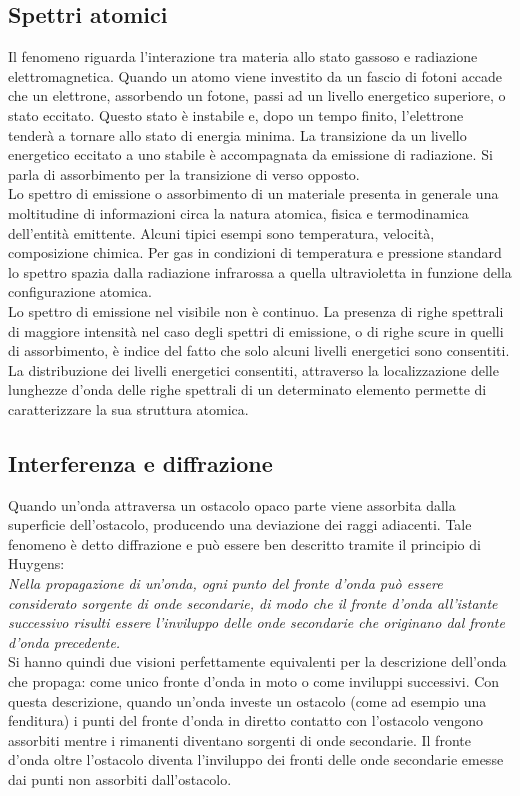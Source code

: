 \subsection{Spettri atomici }
Il  fenomeno  riguarda  l’interazione  tra  materia  allo  stato  gassoso  e  radiazione elettromagnetica. Quando un atomo viene investito da un fascio di fotoni accade che un elettrone, assorbendo un fotone, passi ad un livello energetico superiore, o stato eccitato. Questo stato è instabile e, dopo un tempo finito, l'elettrone tenderà a tornare allo stato di energia minima. La transizione da un livello energetico eccitato a uno stabile è accompagnata da emissione di radiazione. 
Si parla di assorbimento per la transizione di verso opposto.\\
%
Lo spettro di emissione o assorbimento di un materiale presenta in generale una moltitudine di informazioni circa la natura atomica, fisica e termodinamica dell'entità emittente. Alcuni tipici esempi sono temperatura, velocità, composizione chimica.
%
Per gas in condizioni di temperatura e pressione standard lo spettro spazia dalla radiazione infrarossa a quella ultravioletta in funzione della configurazione atomica.\\
%
Lo spettro di emissione nel visibile non è continuo. La presenza di righe spettrali di maggiore intensità nel caso degli spettri di emissione, o di righe scure in quelli di assorbimento, è indice del fatto che solo alcuni livelli energetici sono consentiti.
La distribuzione dei livelli energetici consentiti, attraverso la localizzazione delle lunghezze d'onda delle righe spettrali di un determinato elemento permette di caratterizzare la sua struttura atomica.
%
%
\subsection{Interferenza e diffrazione}
Quando un'onda attraversa un ostacolo opaco parte viene assorbita dalla superficie dell'ostacolo, producendo una deviazione dei raggi adiacenti. Tale fenomeno è detto diffrazione e può essere ben descritto tramite il principio di Huygens:\\
\textit{Nella propagazione di un'onda, ogni punto del fronte d'onda può essere considerato sorgente di onde secondarie, di modo che il fronte d'onda all'istante successivo risulti essere l'inviluppo delle onde secondarie che originano dal fronte d'onda precedente.}\\
Si hanno quindi due visioni perfettamente equivalenti per la descrizione dell'onda che propaga: come unico fronte d'onda in moto o come inviluppi successivi. Con questa descrizione, quando un'onda investe un ostacolo (come ad esempio una fenditura) i punti del fronte d'onda in diretto contatto con l'ostacolo vengono assorbiti mentre i rimanenti diventano sorgenti di onde secondarie. Il fronte d'onda oltre l'ostacolo diventa l'inviluppo dei fronti delle onde secondarie emesse dai punti non assorbiti dall'ostacolo.

